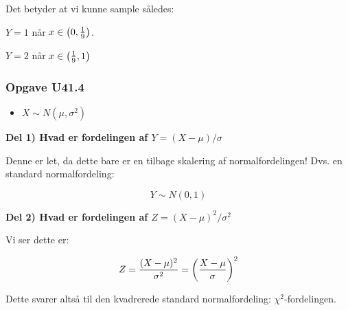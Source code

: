 Det betyder at vi kunne sample således:

$Y = 1$ når $x \in \left( 0, \frac{1}{9} \right)$.

$Y =2$ når $x \in \left( \frac{1}{9}, 1 \right) $

\subsubsection{Opgave U41.4}

\begin{itemize}
    \item $X \sim N(\mu, \sigma^2)$
\end{itemize}

\textbf{Del 1) Hvad er fordelingen af $Y = (X -\mu) / \sigma$}

Denne er let, da dette bare er en tilbage skalering af normalfordelingen! Dvs. en standard normalfordeling:

\begin{equation}
    Y \sim N(0,1)
\end{equation}

\textbf{Del 2) Hvad er fordelingen af $Z = (X -\mu)^{2} / \sigma^2 $}

Vi ser dette er:

\begin{equation}
     Z = \frac{(X -\mu)^2}{\sigma^2} = \left( \frac{X - \mu }{\sigma} \right)^2
\end{equation}

Dette svarer altså til den kvadrerede standard normalfordeling: $\chi^2$-fordelingen.